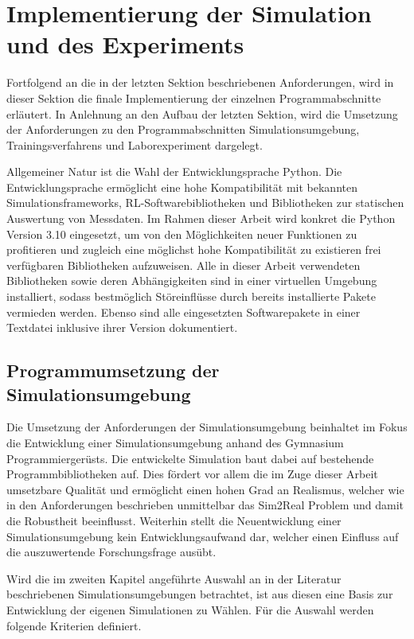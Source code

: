 \section{Implementierung der Simulation und des Experiments}

Fortfolgend an die in der letzten Sektion beschriebenen Anforderungen, wird in dieser Sektion die finale Implementierung der einzelnen Programmabschnitte erläutert.
In Anlehnung an den Aufbau der letzten Sektion, wird die Umsetzung der Anforderungen zu den Programmabschnitten Simulationsumgebung, Trainingsverfahrens und Laborexperiment dargelegt.

Allgemeiner Natur ist die Wahl der Entwicklungsprache Python.
Die Entwicklungsprache ermöglicht eine hohe Kompatibilität mit bekannten Simulationsframeworks, RL-Softwarebibliotheken und Bibliotheken zur statischen Auswertung von Messdaten.
Im Rahmen dieser Arbeit wird konkret die Python Version 3.10 eingesetzt, um von den Möglichkeiten neuer Funktionen zu profitieren und zugleich eine möglichst hohe Kompatibilität zu existieren frei verfügbaren Bibliotheken aufzuweisen.
Alle in dieser Arbeit verwendeten Bibliotheken sowie deren Abhängigkeiten sind in einer virtuellen Umgebung installiert, sodass bestmöglich Störeinflüsse durch bereits installierte Pakete vermieden werden.
Ebenso sind alle eingesetzten Softwarepakete in einer Textdatei inklusive ihrer Version dokumentiert.

\subsection{Programmumsetzung der Simulationsumgebung}

Die Umsetzung der Anforderungen der Simulationsumgebung beinhaltet im Fokus die Entwicklung einer Simulationsumgebung anhand des Gymnasium Programmiergerüsts.
Die entwickelte Simulation baut dabei auf bestehende Programmbibliotheken auf.
Dies fördert vor allem die im Zuge dieser Arbeit umsetzbare Qualität und ermöglicht einen hohen Grad an Realismus, welcher wie in den Anforderungen beschrieben unmittelbar das Sim2Real Problem und damit die Robustheit beeinflusst.
Weiterhin stellt die Neuentwicklung einer Simulationsumgebung kein Entwicklungsaufwand dar, welcher einen Einfluss auf die auszuwertende Forschungsfrage ausübt.

Wird die im zweiten Kapitel angeführte Auswahl an in der Literatur beschriebenen Simulationsumgebungen betrachtet, ist aus diesen eine Basis zur Entwicklung der eigenen Simulationen zu Wählen.
Für die Auswahl werden folgende Kriterien definiert.

